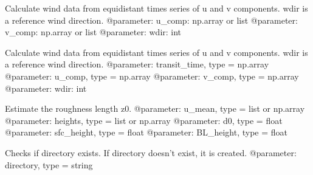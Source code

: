 \documentclass[letterpaper,10pt,english]{sphinxmanual}
\begin{document}

\begin{fulllineitems}
\label{\detokenize{index:windtunnel.calc_wind_stats}}
Calculate wind data from equidistant times series of u and 
v components. wdir is a reference wind direction.
@parameter: u\_comp: np.array or list
@parameter: v\_comp: np.array or list
@parameter: wdir: int

\end{fulllineitems}


\begin{fulllineitems}
\label{\detokenize{index:windtunnel.calc_wind_stats_wght}}
Calculate wind data from equidistant times series of u and 
v components. wdir is a reference wind direction.
@parameter: transit\_time, type = np.array
@parameter: u\_comp, type = np.array
@parameter: v\_comp, type = np.array
@parameter: wdir: int

\end{fulllineitems}


\begin{fulllineitems}
\label{\detokenize{index:windtunnel.calc_z0}}
Estimate the roughness length z0.
@parameter: u\_mean, type = list or np.array
@parameter: heights, type = list or np.array
@parameter: d0, type = float
@parameter: sfc\_height, type = float
@parameter: BL\_height, type = float

\end{fulllineitems}


\begin{fulllineitems}
\label{\detokenize{index:windtunnel.check_directory}}
Checks if directory exists. If directory doesn’t exist, it is created.
@parameter: directory, type = string

\end{fulllineitems}
\end{document}
